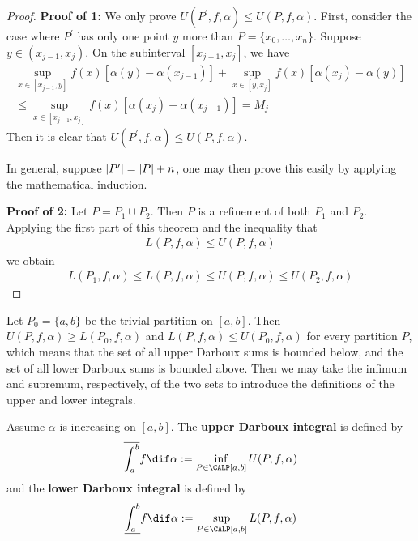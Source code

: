 \documentclass[thmcnt=section, color=blue, 12pt]{my-elegantbook}
\begin{document}
\begin{proof}
	\noindent\textbf{Proof of 1:}
	We only prove $U(P^\prime, f, \alpha) \leq U(P, f, \alpha)$.
	First, consider the case where $P^\prime$
	has only one point $y$ more than $P = \{x_0, \ldots, x_n\}$.
	Suppose $y \in (x_{j-1}, x_j)$.
	On the subinterval $[x_{j-1}, x_j]$, we have
	\begin{multline*}
		\sup_{x \in [x_{j-1}, y]} f(x) [\alpha(y) - \alpha(x_{j-1})]
		+ \sup_{x \in [y, x_j]} f(x) [\alpha(x_{j}) - \alpha(y)] \\
		\leq \sup_{x \in [x_{j-1}, x_j]} f(x) [\alpha(x_{j}) - \alpha(x_{j-1})]
		= M_j
	\end{multline*}
	Then it is clear that $U(P^\prime, f, \alpha) \leq U(P, f, \alpha)$.

	In general, suppose $\left\lvert P^\prime \right\rvert = \left\lvert P \right\rvert + n$,
	one may then prove this easily by
	applying the mathematical induction.


	\noindent\textbf{Proof of 2:}
	Let $P = P_1 \cup P_2$.
	Then $P$ is a refinement of both $P_1$ and $P_2$.
	Applying the first part of this theorem and the inequality that
	\begin{align*}
		L(P, f, \alpha) \leq U(P, f, \alpha)
	\end{align*}
	we obtain
	\begin{align*}
		L(P_1, f, \alpha) \leq L(P, f, \alpha) \leq U(P, f, \alpha)
		\leq U(P_2, f, \alpha)
	\end{align*}
\end{proof}

Let $P_0 = \{a, b\}$ be the trivial partition on $[a, b]$.
Then $U(P, f, \alpha) \geq L(P_0, f, \alpha)$
and $L(P, f, \alpha) \leq U(P_0, f, \alpha)$ for every partition $P$,
which means that the set of all upper Darboux sums is bounded below,
and the set of all lower Darboux sums is bounded above.
Then we may take the infimum and supremum, respectively, of the two sets
to introduce the definitions of the upper and lower integrals.


\begin{definition}
	Assume $\alpha$ is increasing on $[a, b]$.
	The \textbf{upper Darboux integral}
	is defined by
	\begin{align*}
		\overline{\int_a^b} f \dif \alpha
		:= \inf_{P \in \CALP[a, b]} U(P, f, \alpha)
	\end{align*}
	and the  \textbf{lower Darboux integral}
	is defined by
	\begin{align*}
		\underline{\int_a^b} f \dif \alpha
		:= \sup_{P \in \CALP[a, b]} L(P, f, \alpha)
	\end{align*}
\end{definition}
\end{document}
